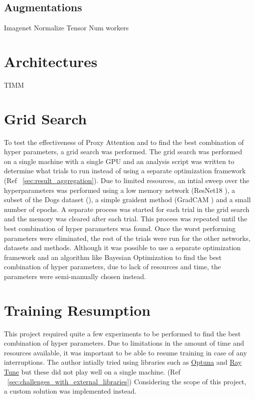 \subsection{Augmentations}
Imagenet Normalize
Tensor
Num workers

\section{Architectures}
TIMM

\section{Grid Search}
To test the effectiveness of Proxy Attention and to find the best combination of hyper parameters, a grid search was performed. The grid search was performed on a single machine with a single GPU and an analysis script was written to determine what trials to run instead of using a separate optimization framework (Ref ~\ref{sec:result_aggregation}). 
Due to limited resources, an intial sweep over the hyperparameters was performed using a low memory network (ResNet18 \cite{heDeepResidualLearning2016}), a subset of the Dogs dataset (\cite{khoslaNovelDatasetFineGrained}), a simple graident method (GradCAM \cite{selvarajuGradCAMVisualExplanations}) and a small number of epochs. A separate process was started for each trial in the grid search and the memory was cleared after each trial. This process was repeated until the best combination of hyper parameters was found. Once the worst performing parameters were eliminated, the rest of the trials were run for the other networks, datasets and methods.
Although it was possible to use a separate optimization framework and an algorithm like Bayesian Optimization to find the best combination of hyper parameters, due to lack of resources and time, the parameters were semi-manually chosen instead.


\section{Training Resumption}
This project required quite a few experiments to be performed to find the best combination of hyper parameters. Due to limitations in the amount of time and resources available, it was important to be able to resume training in case of any interruptions. The author intially tried using libraries such as \href{https://github.com/optuna/optuna}{Optuna} and \href{https://github.com/ray-project/ray}{Ray Tune} but these did not play well on a single machine. (Ref ~\ref{sec:challenges_with_external_libraries}) Considering the scope of this project, a custom solution was implemented instead.

